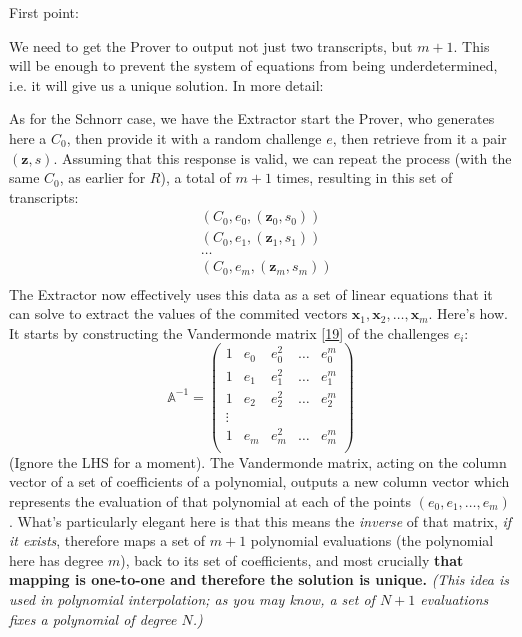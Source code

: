 \documentclass[10pt,a4paper]{article}
\begin{document}
First point:

We need to get the Prover to output not just two transcripts, but $m+1$. This
will be enough to prevent the system of equations from being
underdetermined, i.e. it will give us a unique solution. In more detail:

As for the Schnorr case, we have the Extractor start the Prover, who
generates here a $C_0$, then provide it with a random challenge $e$, then
retrieve from it a pair $(\mathbf{z}, s)$. Assuming that this response is
valid, we can repeat the process (with the same $C_0$, as earlier for $R$), a total of $m+1$ times, resulting in this set of transcripts:
\begin{align*}
&(C_0, e_0, (\mathbf{z}_0 , s_0)) \\
&(C_0, e_1, (\mathbf{z}_1 , s_1)) \\
&\ldots \\
&(C_0, e_m, (\mathbf{z}_m , s_m)) \\
\end{align*}
The Extractor now effectively uses this data as a set of linear
equations that it can solve to extract the values of the commited
vectors $\mathbf{x}_1, \mathbf{x}_2, \ldots, \mathbf{x}_m$. Here's how. It starts by constructing the Vandermonde matrix
{[}\protect\hyperlink{anchor-30}{19}{]} of the challenges $e_i$:
\[
\mathbb{A}^{-1} = \begin{pmatrix}
1 & e_0 & e_0^2 & \dots & e_0^m \\
1 & e_1 & e_1^2 & \dots & e_1^m \\
1 & e_2 & e_2^2 & \dots & e_2^m \\
\vdots  \\
1 & e_m & e_m^2 & \dots & e_m^m \\
\end{pmatrix}
\]
(Ignore the LHS for a moment). The Vandermonde matrix, acting on the
column vector of a set of coefficients of a polynomial, outputs a new
column vector which represents the evaluation of that polynomial at each
of the points $(e_0, e_1, \ldots , e_m)$. What's particularly elegant here is that this means the
\emph{inverse} of that matrix, \emph{if it exists}, therefore maps a set
of $m+1$ polynomial evaluations (the polynomial here has degree $m$), back to its
set of coefficients, and most crucially \textbf{that mapping is one-to-one
and therefore the solution is unique. }\emph{(This idea is used in
polynomial interpolation; as you may know, a set of $N+1$ evaluations
fixes a polynomial of degree $N$.)}
\end{document}
